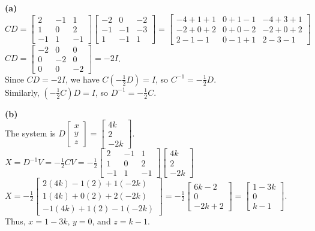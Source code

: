 \begin{solution}
\textbf{(a)} \\
$CD = \begin{bmatrix} 2 & -1 & 1 \\ 1 & 0 & 2 \\ -1 & 1 & -1 \end{bmatrix} \begin{bmatrix} -2 & 0 & -2 \\ -1 & -1 & -3 \\ 1 & -1 & 1 \end{bmatrix} = \begin{bmatrix} -4+1+1 & 0+1-1 & -4+3+1 \\ -2+0+2 & 0+0-2 & -2+0+2 \\ 2-1-1 & 0-1+1 & 2-3-1 \end{bmatrix}$ \\
$CD = \begin{bmatrix} -2 & 0 & 0 \\ 0 & -2 & 0 \\ 0 & 0 & -2 \end{bmatrix} = -2I$. \\
Since $CD = -2I$, we have $C\left(-\frac{1}{2}D\right) = I$, so $C^{-1} = -\frac{1}{2}D$. \\
Similarly, $\left(-\frac{1}{2}C\right)D = I$, so $D^{-1} = -\frac{1}{2}C$.

\medskip
\textbf{(b)} \\
The system is $D \begin{bmatrix} x \\ y \\ z \end{bmatrix} = \begin{bmatrix} 4k \\ 2 \\ -2k \end{bmatrix}$. \\
$X = D^{-1}V = -\frac{1}{2}C V = -\frac{1}{2} \begin{bmatrix} 2 & -1 & 1 \\ 1 & 0 & 2 \\ -1 & 1 & -1 \end{bmatrix} \begin{bmatrix} 4k \\ 2 \\ -2k \end{bmatrix}$ \\
$X = -\frac{1}{2} \begin{bmatrix} 2(4k) - 1(2) + 1(-2k) \\ 1(4k) + 0(2) + 2(-2k) \\ -1(4k) + 1(2) - 1(-2k) \end{bmatrix} = -\frac{1}{2} \begin{bmatrix} 6k - 2 \\ 0 \\ -2k + 2 \end{bmatrix} = \begin{bmatrix} 1 - 3k \\ 0 \\ k - 1 \end{bmatrix}$. \\
Thus, $x = 1 - 3k$, $y = 0$, and $z = k - 1$.


\end{solution}
